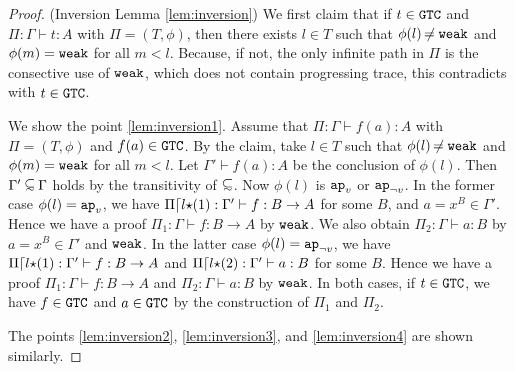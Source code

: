 \begin{proof}(Inversion Lemma \ref{lem:inversion})
  We first claim that if $t\in{\tt GTC}$ and $\Pi:\Gamma\vdash t:A$ with $\Pi=(T,\phi)$, 
  then there exists $l\in T$ such that $\phi(l) \not\nobreak\mkern -2mu = {\tt weak}$ and $\phi(m) = {\tt weak}$ for all $m < l$.
  Because, if not, the only infinite path in $\Pi$ is the consective use of ${\tt weak}$,
  which does not contain progressing trace, this contradicts with $t\in{\tt GTC}$.

  We show the point \ref{lem:inversion1}.
  Assume that $\Pi:\Gamma\vdash f(a):A$ with $\Pi=(T,\phi)$ and $f(a) \in {\tt GTC}$.
  By the claim, take $l\in T$ such that $\phi(l) \not\nobreak\mkern -2mu = {\tt weak}$ and $\phi(m) = {\tt weak}$ for all $m < l$.
  Let $\Gamma' \vdash f(a):A$ be the conclusion of $\phi(l)$. Then $\Gamma'\subseteqsim \Gamma$ holds
  by the transitivity of $\subseteqsim$.
  Now $\phi(l)$ is $\apvar$ or $\apnotvar$.
  In the former case $\phi(l) = \apvar$, we have $\Pi{\lceil} l{\star}(1):\Gamma'\vdash f:B\to A$ for some $B$,
  and $a = x^B \in \Gamma'$. Hence we have a proof $\Pi_1:\Gamma\vdash f:B\to A$ by ${\tt weak}$. 
  We also obtain $\Pi_2:\Gamma\vdash a:B$ by $a = x^B \in \Gamma'$ and ${\tt weak}$. 
  In the latter case $\phi(l) = \apnotvar$,
  we have $\Pi{\lceil} l{\star}(1):\Gamma'\vdash f:B\to A$ and $\Pi{\lceil} l{\star}(2):\Gamma'\vdash a:B$ for some $B$. 
  Hence we have a proof $\Pi_1:\Gamma\vdash f:B\to A$ and $\Pi_2:\Gamma\vdash a:B$ by ${\tt weak}$.
  In both cases, if $t\in{\tt GTC}$, we have $f\in{\tt GTC}$ and $a\in{\tt GTC}$ by the construction of $\Pi_1$ and $\Pi_2$. 
  
  The points \ref{lem:inversion2}, \ref{lem:inversion3}, and \ref{lem:inversion4} are shown similarly. 
\end{proof}

%

